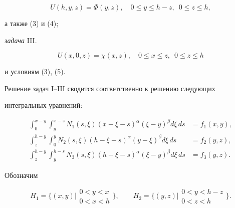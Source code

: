 \begin{equation} 


U(h,y,z)=\Phi(y,z),\quad 0\le y\le h-z,\ \; 0\le z\le h, 


\end{equation} 


а также (3) и (4); 


 


{\it задача} III. 


$$ 


U(x,0,z)=\chi(x,z),\quad 0\le x\le z, \ \; 0\le z\le h 


$$ 


и условиям (3), (5). 


 


Решение задач I--III сводится соответственно к решению следующих 


интегральных уравнений:


\begin{align} 


\int^{x-y}_0\int^{x-z}_y N_1(s,\xi)(x-\xi-s)^\alpha 


(\xi-y)^\beta d\xi\,ds&=f_1(x,y), \\ 


\int^{h-y}_z \int^y_0 N_2(s,\xi)(h-\xi-s)^\alpha 


(y-\xi)^\beta d\xi\,ds&=f_2(y,z), \\ 


\int^{h-y}_z \int^{h-s}_y N_3(s,\xi)(h-\xi-s)^\alpha 


(\xi-y)^\beta d\xi\,ds&=f_3(y,z). 


\end{align} 


Обозначим 


$$ 


H_1=\biggl\{(x,y)\bigg| 


\begin{array}{l} 0<y<x \\ 0<x<h \end{array} 


\biggr\},\qquad 


H_2=\biggl\{(y,z)\bigg| 


\begin{array}{l} 0<y<h-z \\ 0<z<h \end{array} 


\biggr\}.


$$ 


